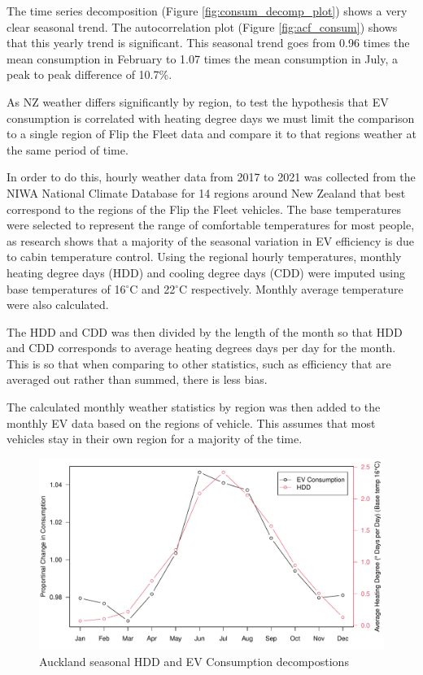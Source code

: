 \documentclass[
]{article}
\begin{document}
The time series decomposition (Figure \ref{fig:consum_decomp_plot})
shows a very clear seasonal trend. The autocorrelation plot (Figure
\ref{fig:acf_consum}) shows that this yearly trend is significant. This
seasonal trend goes from 0.96 times the mean consumption in February to
1.07 times the mean consumption in July, a peak to peak difference of
10.7\%.

As NZ weather differs significantly by region, to test the hypothesis
that EV consumption is correlated with heating degree days we must limit
the comparison to a single region of Flip the Fleet data and compare it
to that regions weather at the same period of time.

In order to do this, hourly weather data from 2017 to 2021 was collected
from the NIWA National Climate Database for 14 regions around New
Zealand that best correspond to the regions of the Flip the Fleet
vehicles. The base temperatures were selected to represent the range of
comfortable temperatures for most people, as research shows that a
majority of the seasonal variation in EV efficiency is due to cabin
temperature control\cite{ev_range}. Using the regional hourly
temperatures, monthly heating degree days (HDD) and cooling degree days
(CDD) were imputed using base temperatures of 16\(^\circ\)C and
22\(^\circ\)C respectively. Monthly average temperature were also
calculated.

The HDD and CDD was then divided by the length of the month so that HDD
and CDD corresponds to average heating degrees days per day for the
month. This is so that when comparing to other statistics, such as
efficiency that are averaged out rather than summed, there is less bias.

The calculated monthly weather statistics by region was then added to
the monthly EV data based on the regions of vehicle. This assumes that
most vehicles stay in their own region for a majority of the time.

\begin{figure}
\centering
\includegraphics{final_report_files/figure-latex/consum_HDD_plot-1.pdf}
\caption{Auckland seasonal HDD and EV Consumption
decompostions\label{fig:consum_HDD_plot}}
\end{figure}
\end{document}
